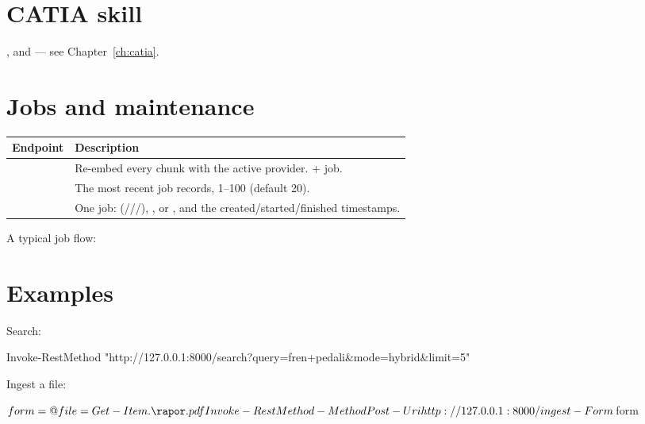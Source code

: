 \section{CATIA skill}

,
 and
 --- see Chapter~\ref{ch:catia}.

\section{Jobs and maintenance}
\label{sec:jobs-api}

\begin{longtable}{L{0.30\textwidth} L{0.60\textwidth}}
\toprule
\textbf{Endpoint} & \textbf{Description} \\
\midrule
\endfirsthead
\bottomrule
\endfoot
{} & Re-embed every chunk with the active
provider.  + job. \\
 & The most recent job records,  1--100 (default
20). \\
 & One job: 
(///), 
,  or , and the
created/started/finished timestamps. \\
\end{longtable}

A typical job flow:


\section{Examples}

Search:

\begin{shellblock}
Invoke-RestMethod "http://127.0.0.1:8000/search?query=fren+pedali&mode=hybrid&limit=5"
\end{shellblock}

Ingest a file:

\begin{shellblock}
$form = @{ file = Get-Item .\rapor.pdf }
Invoke-RestMethod -Method Post -Uri http://127.0.0.1:8000/ingest -Form $form
\end{shellblock}

